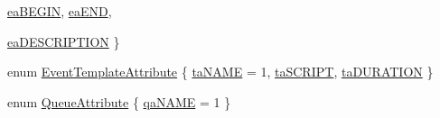 \begin{DoxyCompactItemize}
\hyperlink{namespacestorage_a6e2b156f6c0c979e3e6d80ed6ba55420a7cf33f29983d72ae16eae43ca50b6fc3}{eaBEGIN}, 
\hyperlink{namespacestorage_a6e2b156f6c0c979e3e6d80ed6ba55420a23c12949159e98618bf687dd1376ed3b}{eaEND}, 
\par
\hyperlink{namespacestorage_a6e2b156f6c0c979e3e6d80ed6ba55420af89b5d32c067478da3e65f1ce21bef52}{eaDESCRIPTION}
 \}
\item 
enum \hyperlink{namespacestorage_a4e52cb7b4b8b22d0c4d69d9a82a1a6b6}{EventTemplateAttribute} \{ \hyperlink{namespacestorage_a4e52cb7b4b8b22d0c4d69d9a82a1a6b6a0c62fdfb94f1f5f8cadd4741cb5f5dfe}{taNAME} =  1, 
\hyperlink{namespacestorage_a4e52cb7b4b8b22d0c4d69d9a82a1a6b6a050306964f7ae6811d9fa8090f5cda84}{taSCRIPT}, 
\hyperlink{namespacestorage_a4e52cb7b4b8b22d0c4d69d9a82a1a6b6ac8a094ded1dc6817caf6f3a89a83c6f5}{taDURATION}
 \}
\item 
enum \hyperlink{namespacestorage_a7b75107b1860d57c84e341db35541d94}{QueueAttribute} \{ \hyperlink{namespacestorage_a7b75107b1860d57c84e341db35541d94a0e629ed373383d85c7ebac611c31dfaf}{qaNAME} =  1
 \}
\end{DoxyCompactItemize}


